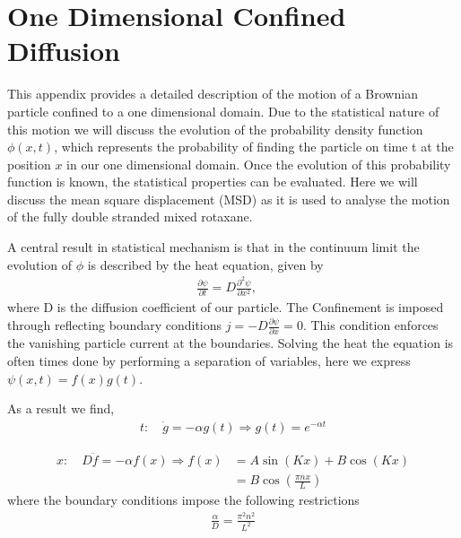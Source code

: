 \chapter{One Dimensional Confined Diffusion}

This appendix provides a detailed description of the motion of a Brownian particle
confined to a one dimensional domain. Due to the statistical nature of this motion we
will discuss the evolution of the probability density function $\phi(x,t)$, which
represents the probability of finding the particle on time t at the position $x$ in our
one dimensional domain.  Once the
evolution of this probability function is known, the statistical properties can be
evaluated. Here we will discuss the mean square displacement (MSD) as it is used to
analyse the motion of the fully double stranded mixed rotaxane.

A central result in statistical mechanism is that in the continuum limit the evolution of
$\phi$ is  described by the heat equation, given by
\begin{align*}
  \frac{\partial \psi}{\partial t} =  D \frac{\partial^2 \psi}{\partial x^2}, \quad
\end{align*}
where D is the diffusion coefficient of our particle.
The Confinement is imposed through reflecting boundary conditions $j = - D \frac{\partial
\psi}{\partial x} = 0$. This condition enforces the vanishing particle current at the
boundaries. Solving the heat the equation is often times done by performing a separation
of variables, here we express $ \psi(x,t) = f(x)g(t)$.

As a result we find,
\begin{align*}
t:\quad \dot{g} = - \alpha g(t) \Rightarrow g(t) = e^{-\alpha t}
\end{align*}

\begin{align*}
  x:\quad D \ddot{f} = - \alpha f(x) \Rightarrow f(x) &= A \sin(K x) + B \cos(Kx)\\
  &= B \cos(\frac{\pi n x}{L})
\end{align*}
where the boundary conditions impose the following restrictions
\begin{align*}
  \frac{\alpha}{D} = \frac{\pi^2 n^2}{L^2}
\end{align*}

